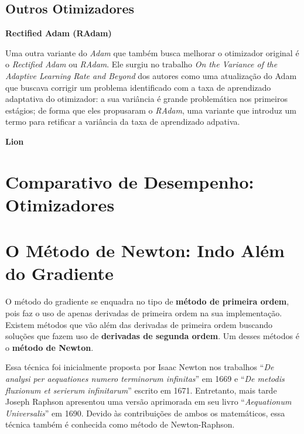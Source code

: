 \subsection{Outros Otimizadores}

\textbf{Rectified Adam (RAdam)} 

Uma outra variante do \textit{Adam} que também busca melhorar o otimizador original é o \textit{Rectified Adam} ou \textit{RAdam}. Ele surgiu no trabalho \textit{On the Variance of the Adaptive Learning Rate and Beyond} dos autores \textcite{RAdamMethod} como uma atualização do Adam que buscava corrigir um problema identificado com a taxa de aprendizado adaptativa do otimizador: a sua variância é grande problemática nos primeiros estágios; de forma que eles propusaram o \textit{RAdam}, uma variante que introduz um termo para retificar a variância da taxa de aprendizado adpativa.

\textbf{Lion} 

\section{Comparativo de Desempenho: Otimizadores}


\section{O Método de Newton: Indo Além do Gradiente}

O método do gradiente se enquadra no tipo de \textbf{método de primeira ordem}, pois faz o uso de apenas derivadas de primeira ordem na sua implementação. Existem métodos que vão além das derivadas de primeira ordem buscando soluções que fazem uso de \textbf{derivadas de segunda ordem}. Um desses métodos é o \textbf{método de Newton}.

Essa técnica foi inicialmente proposta por Isaac Newton nos trabalhos “\textit{De analysi per aequationes numero terminorum infinitas}” em 1669 e “\textit{De metodis fluxionum et serierum infinitarum}” escrito em 1671. Entretanto, mais tarde Joseph Raphson apresentou uma versão aprimorada em seu livro “\textit{Aequationum Universalis}” em 1690. Devido às contribuições de ambos os matemáticos, essa técnica também é conhecida como método de Newton-Raphson.

